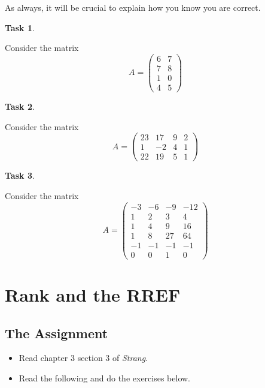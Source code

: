 \documentclass[10pt,]{book}
\theoremstyle{plain}
\theoremstyle{definition}
\numberwithin{equation}{section}
\newtheorem{task}{Task}[chapter]
\begin{document}
      As always, it will be crucial to explain how you know you are correct.
\begin{task}
\label{task-91}

        Consider the matrix
        \[
          A = \begin{pmatrix}
          6 & 7 \\
          7 & 8 \\
          1 & 0 \\
          4 & 5
          \end{pmatrix}
        \]\end{task}
\begin{task}
\label{task-92}

        Consider the matrix
        \[
          A = \begin{pmatrix}
          23 & 17 & 9 & 2 \\
          1 & -2 & 4 & 1 \\
          22 & 19 & 5 & 1
          \end{pmatrix}
        \]\end{task}
\begin{task}
\label{task-93}

        Consider the matrix
        \[
          A = \begin{pmatrix}
          -3 & -6 & -9 & -12 \\
          1 & 2 & 3 & 4 \\
          1 & 4 & 9 & 16 \\
          1 & 8 & 27 & 64 \\
          -1 & -1 & -1 & -1 \\
          0 & 0 & 1 & 0
          \end{pmatrix}
        \]\end{task}
\clearpage
\typeout{************************************************}
\typeout{************************************************}
\section[Rank and the RREF]{Rank and the RREF}\label{rank}
\typeout{************************************************}
\typeout{************************************************}
\subsection[The Assignment]{The Assignment}\label{subsection-68}
\begin{itemize}
\item{}Read chapter 3 section 3 of \emph{Strang}.\item{}Read the following and do the exercises below.\end{itemize}
\typeout{************************************************}
\typeout{************************************************}
\end{document}

